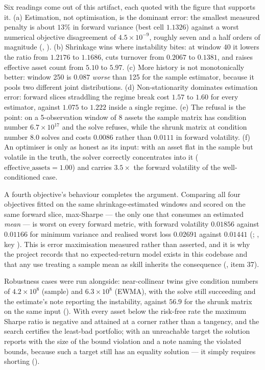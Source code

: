 \documentclass[11pt,a4paper]{article}
\begin{document}
Six readings come out of this artifact, each quoted with the figure that supports it.
(a) Estimation, not optimisation, is the dominant error: the smallest measured penalty is
about $13\%$ in forward variance (best cell $1.1326$) against a worst numerical objective
disagreement of $4.5\times 10^{-9}$, roughly seven and a half orders of magnitude
(,
). (b) Shrinkage wins where instability
bites: at window 40 it lowers the ratio from $1.2176$ to $1.1686$, cuts turnover from $0.2067$
to $0.1381$, and raises effective asset count from $5.10$ to $5.97$. (c) More history is not
monotonically better: window 250 is $0.087$ \emph{worse} than 125 for the sample estimator,
because it pools two different joint distributions. (d) Non-stationarity dominates estimation
error: forward slices straddling the regime break cost $1.57$ to $1.60$ for every estimator,
against $1.075$ to $1.222$ inside a single regime. (e) The refusal is the point: on a
5-observation window of 8 assets the sample matrix has condition number $6.7\times 10^{17}$
and the solve refuses, while the shrunk matrix at condition number $8.0$ solves and costs
$0.0086$ rather than $0.0111$ in forward volatility. (f) An optimiser is only as honest as its
input: with an asset flat in the sample but volatile in the truth, the solver correctly
concentrates into it ($\text{effective\_assets} = 1.00$) and carries $3.5\times$ the forward
volatility of the well-conditioned case.

A fourth objective's behaviour completes the argument. Comparing all four objectives fitted on
the same shrinkage-estimated windows and scored on the same forward slice, max-Sharpe --- the
only one that consumes an estimated \emph{mean} --- is worst on every forward metric, with
forward volatility $0.01856$ against $0.01166$ for minimum variance and realised worst loss
$0.02691$ against $0.01441$
(;
,
key ). This is error maximisation measured rather than asserted,
and it is why the project records that no expected-return model exists in this codebase and
that any use treating a sample mean as skill inherits the consequence
(, item 37).

Robustness cases were run alongside: near-collinear twins give condition numbers of
$4.2\times 10^{8}$ (sample) and $6.3\times 10^{8}$ (EWMA), with the solve still succeeding and
the estimate's note reporting the instability, against $56.9$ for the shrunk matrix on the same
input (). With every asset
below the risk-free rate the maximum Sharpe ratio is negative and attained at a corner rather
than a tangency, and the search certifies the least-bad portfolio; with an unreachable target the
solution reports  with the size of the bound violation and a note naming
the violated bounds, because such a target still has an equality solution --- it simply requires
shorting ().
\end{document}
